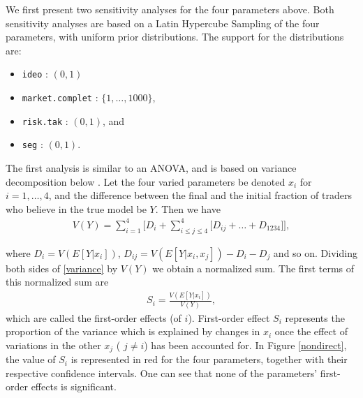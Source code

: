 \documentclass{sig-alternate}
\begin{document}
We first present two sensitivity analyses for the four parameters above. Both sensitivity analyses are based on a Latin Hypercube Sampling of the four parameters, with uniform prior distributions. The support for the distributions are:

\begin{itemize}
	\item \texttt{ideo} : $(0,1)$
	\item \texttt{market.complet} : $ \{1,\dots,1000\}$,  
	\item \texttt{risk.tak}  : $(0,1)$, and
	\item  \texttt{seg} : $(0,1)$.
\end{itemize}
	
	The first analysis is similar to an ANOVA, and is based on  variance decomposition below \cite[Section 2.3.1]{Confalonieri2010}. Let the four varied parameters be denoted $x_i$ for $i =1,\dots,4$, and the difference between the final and the initial fraction of traders who believe in the true model be $Y$. Then we have
	\begin{align}
	\label{variance}
	V(Y) = \sum_{i=1}^4 \Big[  D_i + 
	\sum_{i \leq j \leq 4}^4 \big[ D_{ij} + \dots + 
	D_{1234} \big] \Big],
	\end{align}
	
	where $D_i = V(E[Y|x_i])$, $D_{ij} = V(E[Y|x_i,x_j]) - D_i - D_j$ and so on. Dividing both sides of \eqref{variance} by $V(Y)$ we obtain a normalized sum. The first terms of this normalized sum are
	\begin{align}
	S_i = \frac{V(E[Y|x_i])}{V(Y)},
	\end{align}
	which are called the first-order effects (of $i$). First-order effect $S_i$ represents the proportion of the variance which is explained by changes in $x_i$ once the effect of variations in the other $x_j$ ( $j\neq i$) has been accounted for. In Figure \ref{nondirect},  the value of $S_i$ is represented in red for the four parameters, together with their respective confidence intervals. One can see that none of the parameters' first-order effects is significant. 
	
\end{document}
